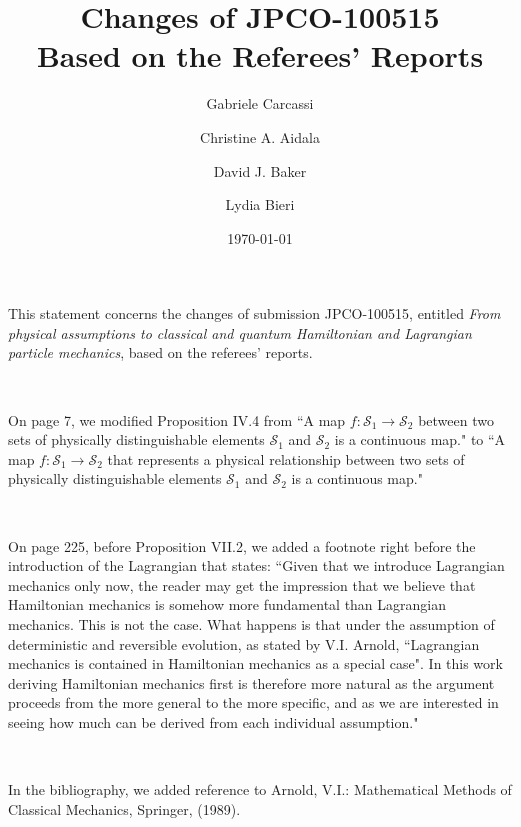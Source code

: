 \documentclass[10pt]{article}
\title{Changes of JPCO-100515 \\
  Based on the Referees' Reports}
\author{Gabriele Carcassi \and Christine A. Aidala \and David J. Baker \and Lydia Bieri}
\date{\today}
\begin{document}
This statement concerns the changes of submission JPCO-100515,
entitled \textit{From physical assumptions to classical and quantum Hamiltonian and Lagrangian particle mechanics}, based on the referees'
reports.

~\newline

On page 7, we modified Proposition IV.4 from ``A map $f : \mathcal{S}_1 \to \mathcal{S}_2$ between two sets
 of physically distinguishable elements $\mathcal{S}_1$ and $\mathcal{S}_2$ is a continuous map." to  ``A map $f:\mathcal{S}_1 \rightarrow \mathcal{S}_2$ that represents a physical relationship between two sets of physically distinguishable elements $\mathcal{S}_1$ and $\mathcal{S}_2$ is a continuous map."

~\newline


On page 225, before Proposition VII.2, we added a footnote right before the introduction of the Lagrangian that states: ``Given that we introduce Lagrangian mechanics only now, the reader may get the impression that we believe that Hamiltonian mechanics is somehow more fundamental than Lagrangian mechanics. This is not the case. What happens is that under the assumption of deterministic and reversible evolution, as stated by V.I. Arnold, ``Lagrangian mechanics is contained in Hamiltonian mechanics as a special case". In this work deriving Hamiltonian mechanics first is therefore more natural as the argument proceeds from the more general to the more specific, and as we are interested in seeing how much can be derived from each individual assumption."

~\newline

In the bibliography, we added reference to Arnold, V.I.: Mathematical Methods of Classical Mechanics, Springer, (1989).
\end{document}
